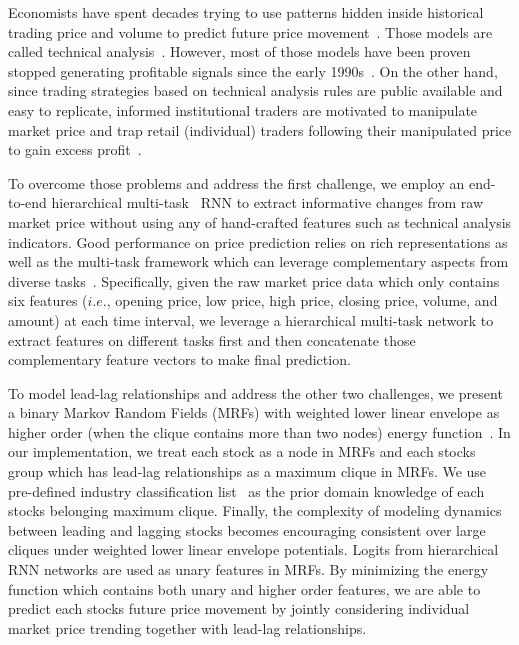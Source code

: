 \documentclass[sigconf,anonymous,review]{acmart}
\renewcommand{\cite}{\citep}
\begin{document}
Economists have spent decades trying to use patterns hidden
inside historical trading price and volume to predict future
price movement~\cite{fama1966filter,jensen1967random}. Those
models are called technical
analysis~\cite{kirkpatrick2010technical}. However, most of those
models have been proven stopped generating profitable signals
since the early 1990s~\cite{park2007we}. On the other hand, since
trading strategies based on technical analysis rules are public
available and easy to replicate, informed institutional traders
are motivated to manipulate market price and trap retail
(individual) traders following their manipulated price to gain
excess profit~\cite{sun2016decision}.

To overcome those problems and address the first challenge, we employ an end-to-end
hierarchical multi-task~\cite{caruana1993multitask} RNN to
extract informative changes from raw market price without using
any of hand-crafted features such as technical analysis
indicators. Good performance on price prediction relies on rich
representations as well as the multi-task framework which can leverage
complementary aspects from diverse tasks~\cite{sogaard2016deep}. Specifically, given the raw market price data which only contains six features ($i.e.$, opening
price, low price, high price, closing price, volume, and amount) at each time interval, we leverage a hierarchical multi-task
network to extract features on different tasks first and then concatenate those complementary feature vectors to make final prediction.

To model lead-lag relationships and address the other two challenges, we present a
binary Markov Random Fields (MRFs) with weighted lower linear envelope as higher order (when the clique contains more than two
nodes) energy function~\cite{Kohli:CVPR07,Nowozin:2011,Gould:ICML2011,gouldlearning}.
In our implementation, we treat each stock as a node in MRFs and each stocks group which has lead-lag relationships as a maximum clique in MRFs. We use pre-defined industry classification
list~\cite{ths} as the prior domain knowledge of each stock\textquotesingle s belonging maximum clique. Finally, the
complexity of modeling dynamics between leading and lagging stocks becomes encouraging consistent over large cliques under
weighted lower linear envelope potentials. Logits from hierarchical RNN networks are used as unary features in MRFs. By minimizing the energy function which contains both unary and higher order
features, we are able to predict each stock\textquotesingle s future price movement by jointly considering individual market
price trending together with lead-lag relationships.
\end{document}
